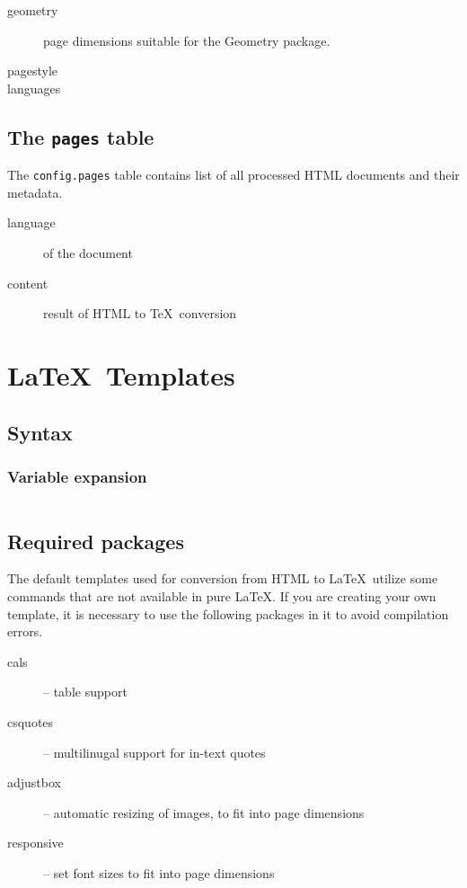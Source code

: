 \documentclass{article}
\begin{document}
\begin{description}

  \item[geometry] page dimensions suitable for the Geometry package. 
  \item[pagestyle]
  \item[languages]
\end{description}

\subsection{The \texttt{pages} table}

The \texttt{config.pages} table contains list of all processed HTML documents and their metadata.

\begin{description}
  \item[language] of the document
  \item[content] result of HTML to \TeX\ conversion
\end{description}

\section{\LaTeX\ Templates}


\subsection{Syntax}

\subsubsection{Variable expansion}

\begin{verbatim}
\end{verbatim}

\subsection{Required packages}


The default templates used for conversion from HTML to \LaTeX\ utilize some
commands that are not available in pure \LaTeX. If you are creating your own
template, it is necessary to use the following packages in it to avoid
compilation errors.

\begin{description}
  \item[cals] -- table support
  \item[csquotes] -- multilinugal support for in-text quotes
  \item[adjustbox] -- automatic resizing of images, to fit into page dimensions
  \item[responsive] -- set font sizes to fit into page dimensions
\end{description}
\end{document}

